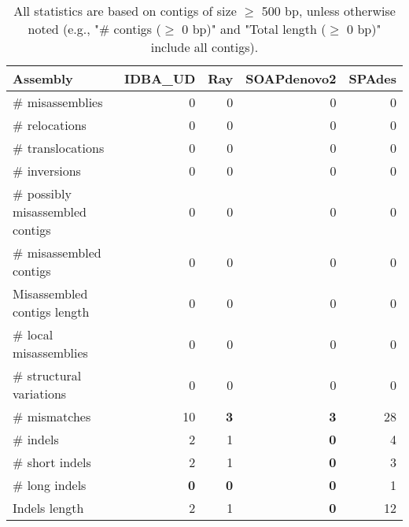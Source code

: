 \documentclass[12pt,a4paper]{article}
\begin{document}
\begin{table}[ht]
\begin{center}
\caption{All statistics are based on contigs of size $\geq$ 500 bp, unless otherwise noted (e.g., "\# contigs ($\geq$ 0 bp)" and "Total length ($\geq$ 0 bp)" include all contigs).}
\begin{tabular}{|l*{4}{|r}|}
\hline
Assembly & IDBA\_UD & Ray & SOAPdenovo2 & SPAdes \\ \hline
\# misassemblies & 0 & 0 & 0 & 0 \\ \hline
\hspace{5mm}\# relocations & 0 & 0 & 0 & 0 \\ \hline
\hspace{5mm}\# translocations & 0 & 0 & 0 & 0 \\ \hline
\hspace{5mm}\# inversions & 0 & 0 & 0 & 0 \\ \hline
\# possibly misassembled contigs & 0 & 0 & 0 & 0 \\ \hline
\# misassembled contigs & 0 & 0 & 0 & 0 \\ \hline
Misassembled contigs length & 0 & 0 & 0 & 0 \\ \hline
\# local misassemblies & 0 & 0 & 0 & 0 \\ \hline
\# structural variations & 0 & 0 & 0 & 0 \\ \hline
\# mismatches & 10 & {\bf 3} & {\bf 3} & 28 \\ \hline
\# indels & 2 & 1 & {\bf 0} & 4 \\ \hline
\hspace{5mm}\# short indels & 2 & 1 & {\bf 0} & 3 \\ \hline
\hspace{5mm}\# long indels & {\bf 0} & {\bf 0} & {\bf 0} & 1 \\ \hline
Indels length & 2 & 1 & {\bf 0} & 12 \\ \hline
\end{tabular}
\end{center}
\end{table}
\end{document}
